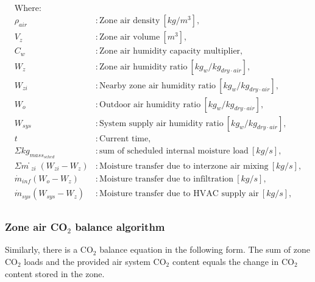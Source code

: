 \begin{align*}
\text{Where: }\\
  \rho_{air} &: \text{Zone air density} ~ [kg/m^{3}], \\
  V_{z} &: \text{Zone air volume} ~ [m^{3}],\\
  C_{w} &: \text{Zone air humidity capacity multiplier},\\
  W_{z} &: \text{Zone air humidity ratio} ~ [kg_w/kg_{dry\cdot air}],\\
  W_{zi} &: \text{Nearby zone air humidity ratio} ~ [kg_w/kg_{dry\cdot air}],\\
  W_{o} &: \text{Outdoor air humidity ratio} ~ [kg_w/kg_{dry\cdot air}],\\
  W_{sys} &: \text{System supply air humidity ratio} ~ [kg_w/kg_{dry\cdot air}],\\
  t &: \text{Current time},\\
  \Sigma{kg_{mass_{sched}}} &: \text{sum of scheduled internal moisture load} ~ [kg/s],\\
  \Sigma{ṁ_{zi}(W_{zi}-W_z)} &: \text{Moisture transfer due to interzone air mixing} ~ [kg/s],\\
  \dot{m}_{inf} (W_o - W_z) &: \text{Moisture transfer due to infiltration} ~ [kg/s],\\
  \dot{m}_{sys} (W_{sys} - W_z) &: \text{Moisture transfer due to HVAC supply air} ~ [kg/s],\\
\end{align*}

\subsubsection{Zone air CO$_2$ balance algorithm}\label{Zone-air-CO$_2$-balance-algorithm}
Similarly, there is a CO$_2$ balance equation in the following form. The sum of zone CO$_2$ loads and the provided air system CO$_2$ content equals the change in CO$_2$ content stored in the zone. 

